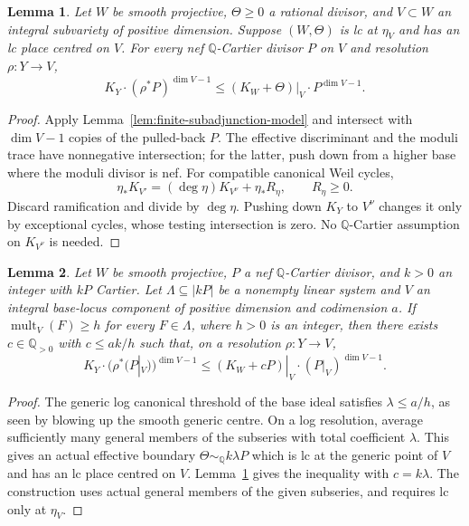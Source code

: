\documentclass[12pt,a4paper,psamsfonts]{amsart}
\theoremstyle{definition}
\theoremstyle{plain}
\newtheorem{lemma}{Lemma}[section]
\newcommand{\Q}{\mathbb Q}
\newcommand{\mult}{\operatorname{mult}}
\begin{document}
\begin{lemma}\label{lem:generic-subadjunction}
Let $W$ be smooth projective, $\Theta\ge0$ a rational divisor,
and $V\subset W$ an integral subvariety of positive dimension.
Suppose $(W,\Theta)$ is lc at $\eta_V$ and has an lc place centred on $V$.
For every nef $\mathbb{Q}$-Cartier divisor $P$ on $V$ and resolution
$\rho:Y\to V$,
\[
 K_Y\cdot(\rho^*P)^{\dim V-1}
 \le (K_W+\Theta)|_V\cdot P^{\dim V-1}.
\]
\end{lemma}
\begin{proof}
Apply Lemma~\ref{lem:finite-subadjunction-model} and intersect with
$\dim V-1$ copies of the pulled-back $P$. The effective discriminant
and the moduli trace have nonnegative intersection; for the latter,
push down from a higher base where the moduli divisor is nef.
For compatible canonical Weil cycles,
\[
 \eta_*K_{V'}=(\deg\eta)K_{V^\nu}+\eta_*R_\eta,
 \qquad R_\eta\ge0.
\]
Discard ramification and divide by $\deg\eta$. Pushing down $K_Y$
to $V^\nu$ changes it only by exceptional cycles, whose testing
intersection is zero. No $\mathbb{Q}$-Cartier assumption on
$K_{V^\nu}$ is needed.
\end{proof}

\begin{lemma}\label{lem:canonical-centre}
Let $W$ be smooth projective, $P$ a nef $\mathbb{Q}$-Cartier divisor,
and $k>0$ an integer with $kP$ Cartier. Let
$\Lambda\subseteq|kP|$ be a nonempty linear system and $V$ an
integral base-locus component of positive dimension and codimension $a$.
If $\mult_V(F)\ge h$ for every $F\in\Lambda$, where $h>0$ is an integer,
then there exists $c\in\Q_{>0}$ with $c\le ak/h$ such that, on a
resolution $\rho:Y\to V$,
\[
 K_Y\cdot(\rho^*(P|_V))^{\dim V-1}
 \le (K_W+cP)|_V\cdot(P|_V)^{\dim V-1}.
\]
\end{lemma}
\begin{proof}
The generic log canonical threshold of the base ideal satisfies
$\lambda\le a/h$, as seen by blowing up the smooth generic
centre. On a log resolution, average sufficiently many general
members of the subseries with total coefficient $\lambda$.
This gives an actual effective boundary
$\Theta\sim_{\Q}k\lambda P$ which is lc at the generic
point of $V$ and has an lc place centred on $V$.
Lemma~\ref{lem:generic-subadjunction} gives the inequality with
$c=k\lambda$. The construction uses actual general members of
the given subseries, and requires lc only at $\eta_V$.
\end{proof}
\end{document}
